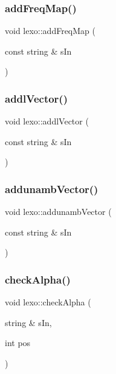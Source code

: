 \subsubsection{\texorpdfstring{add\+Freq\+Map()}{addFreqMap()}}
{\footnotesize\ttfamily void lexo\+::add\+Freq\+Map (\begin{DoxyParamCaption}\item[{const string \&}]{s\+In }\end{DoxyParamCaption})}

\mbox{\label{classlexo_a3d857c46564021e8184fa120f219a29a}} 
\subsubsection{\texorpdfstring{addl\+Vector()}{addlVector()}}
{\footnotesize\ttfamily void lexo\+::addl\+Vector (\begin{DoxyParamCaption}\item[{const string \&}]{s\+In }\end{DoxyParamCaption})}

\mbox{\label{classlexo_aa22bedaba538d542d58d5cb78c55219b}} 
\subsubsection{\texorpdfstring{addunamb\+Vector()}{addunambVector()}}
{\footnotesize\ttfamily void lexo\+::addunamb\+Vector (\begin{DoxyParamCaption}\item[{const string \&}]{s\+In }\end{DoxyParamCaption})}

\mbox{\label{classlexo_a7ac14e81c979e5221ff0ecd1f418e7f7}} 
\subsubsection{\texorpdfstring{check\+Alpha()}{checkAlpha()}}
{\footnotesize\ttfamily void lexo\+::check\+Alpha (\begin{DoxyParamCaption}\item[{string \&}]{s\+In,  }\item[{int}]{pos }\end{DoxyParamCaption})}

